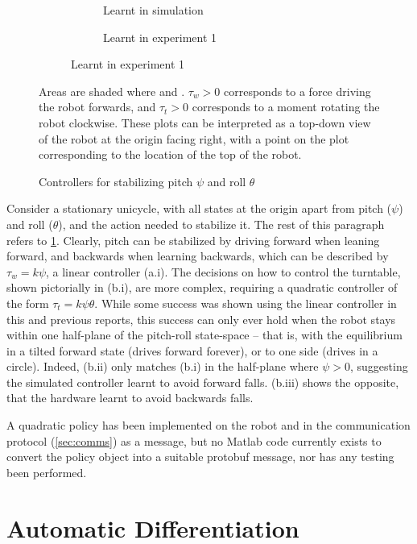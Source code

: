 \documentclass[main.tex]{subfiles}
\begin{document}
\begin{figure}[b!]
\begin{subfigure}[t]{\linewidth}
			\begin{subfigure}{(\linewidth - 2\ctlpadding)/3}
				\caption{Learnt in simulation}
			\end{subfigure}\hfill
			\begin{subfigure}{(\linewidth - 2\ctlpadding)/3}
				\caption{Learnt in experiment 1}
			\end{subfigure}
		\end{subfigure}
		\caption{Controllers for stabilizing pitch $\psi$ and roll $\theta$}
		\label{fig:balancing}
		\medskip
		\small
		Areas are shaded where  and .
		$\tau_w > 0$ corresponds to a force driving the robot forwards, and $\tau_t > 0$ corresponds to a moment rotating the robot clockwise.
		These plots can be interpreted as a top-down view of the robot at the origin facing right, with a point on the plot corresponding to the location of the top of the robot.
	\end{figure}

	Consider a stationary unicycle, with all states at the origin apart from pitch ($\psi$) and roll ($\theta$), and the action needed to stabilize it.
	The rest of this paragraph refers to \cref{fig:balancing}.
	Clearly, pitch can be stabilized by driving forward when leaning forward, and backwards when learning backwards, which can be described by $\tau_w = k\psi$, a linear controller (a.i).
	The decisions on how to control the turntable, shown pictorially in (b.i), are more complex, requiring a quadratic controller of the form $\tau_t = k\psi\theta$.
	While some success was shown using the linear controller in this and previous reports, this success can only ever hold when the robot stays within one half-plane of the pitch-roll state-space -- that is, with the equilibrium in a tilted forward state (drives forward forever), or to one side (drives in a circle).
	Indeed, (b.ii) only matches (b.i) in the half-plane where $\psi > 0$, suggesting the simulated controller learnt to avoid forward falls. (b.iii) shows the opposite, that the hardware learnt to avoid backwards falls.

	A quadratic policy has been implemented on the robot and in the communication protocol (\cref{sec:comms}) as a  message, but no Matlab code currently exists to convert the {\Pilco} policy object into a suitable protobuf message, nor has any testing been performed.


\section{Automatic Differentiation}
\end{document}
